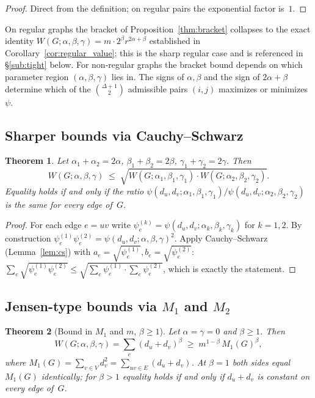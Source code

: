 \documentclass[11pt,a4paper]{article}
\newtheorem{theorem}{Theorem}[section]
\theoremstyle{definition}
\newcommand{\Wuzi}{W(G;\alpha,\beta,\gamma)}
\begin{document}
\begin{proof}
Direct from the definition; on regular pairs the exponential
factor is~$1$.
\end{proof}

On regular graphs the bracket of Proposition~\ref{thm:bracket}
collapses to the exact identity
$\Wuzi = m\cdot 2^{\beta} r^{2\alpha+\beta}$ established in
Corollary~\ref{cor:regular_value}; this is the sharp regular case
and is referenced in \S\ref{sub:tight} below. For non-regular
graphs the bracket bound depends on which
parameter region $(\alpha,\beta,\gamma)$ lies in. The signs of
$\alpha,\beta$ and the sign of $2\alpha+\beta$ determine which of
the $\binom{\Delta+1}{2}$ admissible pairs $(i,j)$ maximizes or
minimizes $\psi$.

\subsection{Sharper bounds via Cauchy--Schwarz}\label{sub:cs}

\begin{theorem}\label{thm:cs}
Let $\alpha_1+\alpha_2=2\alpha$, $\beta_1+\beta_2=2\beta$,
$\gamma_1+\gamma_2=2\gamma$. Then
\[
W(G;\alpha,\beta,\gamma)\;\le\;
\sqrt{W(G;\alpha_1,\beta_1,\gamma_1)\cdot W(G;\alpha_2,\beta_2,\gamma_2)}.
\]
Equality holds if and only if the ratio
$\psi(d_u,d_v;\alpha_1,\beta_1,\gamma_1)/\psi(d_u,d_v;\alpha_2,\beta_2,\gamma_2)$
is the same for every edge of~$G$.
\end{theorem}

\begin{proof}
For each edge $e=uv$ write
$\psi_e^{(k)}=\psi(d_u,d_v;\alpha_k,\beta_k,\gamma_k)$ for $k=1,2$.
By construction
$\psi_e^{(1)}\psi_e^{(2)}=\psi(d_u,d_v;\alpha,\beta,\gamma)^{2}$.
Apply Cauchy--Schwarz (Lemma~\ref{lem:cs}) with
$a_e=\sqrt{\psi_e^{(1)}}, b_e=\sqrt{\psi_e^{(2)}}$:
$\sum_e \sqrt{\psi_e^{(1)}\psi_e^{(2)}}\le
\sqrt{\sum_e \psi_e^{(1)}\cdot \sum_e \psi_e^{(2)}}$,
which is exactly the statement.
\end{proof}

\subsection{Jensen-type bounds via $M_1$ and $M_2$}\label{sub:m1_m2}

\begin{theorem}[Bound in $M_1$ and $m$, $\beta\ge 1$]\label{thm:m1_bound}
Let $\alpha=\gamma=0$ and $\beta\ge 1$. Then
\[
\Wuzi=\sum_{e}(d_u+d_v)^{\beta}\;\ge\; m^{1-\beta}\,M_1(G)^{\beta},
\]
where $M_1(G)=\sum_{v\in V}d_v^{2}=\sum_{uv\in E}(d_u+d_v)$.
At $\beta = 1$ both sides equal $M_1(G)$ identically; for
$\beta > 1$ equality holds if and only if $d_u + d_v$ is constant
on every edge of~$G$.
\end{theorem}
\end{document}
